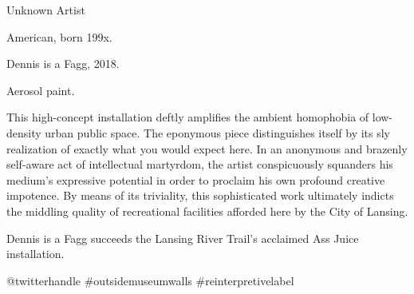 \documentclass[varwidth=5in, border={20pt 20pt 20pt 20pt}]{standalone}
\begin{document}
{\huge\myboldfont Unknown Artist}

American, born 199x.

\medskip

{\large{\myboldfont Dennis is a Fagg}, 2018.}

Aerosol paint.

\bigskip

This high-concept installation deftly amplifies the ambient homophobia of low-density urban public space.
The eponymous piece distinguishes itself by its sly realization of exactly what you would expect here.
In an anonymous and brazenly self-aware act of intellectual martyrdom, the artist conspicuously squanders his medium's expressive potential in order to proclaim his own profound creative impotence.
By means of its triviality, this sophisticated work ultimately indicts the middling quality of recreational facilities afforded here by the City of Lansing.

\medskip

{\myitalicfont Dennis is a Fagg} succeeds the Lansing River Trail's acclaimed {\myitalicfont Ass Juice} installation.

\bigskip

{\myboldfont @twitterhandle} \hfill {\myitalicfont \#outsidemuseumwalls \#reinterpretivelabel}
\end{document}
